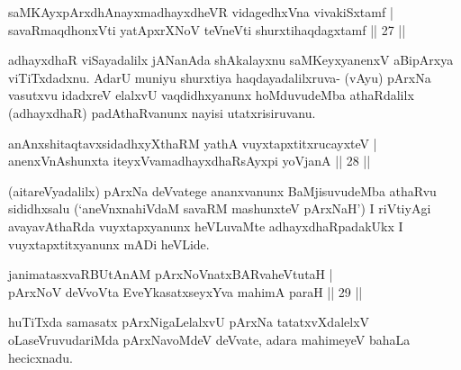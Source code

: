 \begin{shl}
\footnotemark[1]{}saMKAyxpArxdhAnayxmadhayxdheVR vidagedhxVna vivakiSxtamf |\\
savaRmaqdhonxVti yatApxrXNoV teVneVti shurxtihaqdagxtamf \hfill || 27 ||
\end{shl}

\begin{artha}
adhayxdhaR viSayadalilx jANanAda shAkalayxnu saMKeyxyanenxV aBipArxya viTiTxdadxnu. AdarU muniyu shurxtiya haqdayadalilxruva- (vAyu) pArxNa vasutxvu idadxreV elalxvU vaqdidhxyanunx hoMduvudeMba athaRdalilx (adhayxdhaR) padAthaRvanunx nayisi utatxrisiruvanu.
\end{artha}


\begin{shl}
anAnxshitaqtavxsidadhxyXthaRM yathA vuyxtapxtitxrucayxteV |\\
anenxVnAshunxta iteyxVvamadhayxdhaRsAyxpi yoVjanA \hfill || 28 ||
\end{shl}

\begin{artha}
(aitareVyadalilx) pArxNa deVvatege ananxvanunx BaMjisuvudeMba athaRvu sididhxsalu (`aneVnxnahiVdaM savaRM mashunxteV pArxNaH') I riVtiyAgi avayavAthaRda vuyxtapxyanunx heVLuvaMte adhayxdhaRpadakUkx I vuyxtapxtitxyanunx mADi heVLide.
\end{artha}


\begin{shl}
janimatasxvaRBUtAnAM pArxNoV\s natxBARvaheVtutaH |\\
pArxNoV deVvoV\s ta EveYkasatxseyxYva mahimA paraH \hfill || 29 ||
\end{shl}

\begin{artha}
huTiTxda samasatx pArxNigaLelalxvU pArxNa tatatxvXdalelxV oLaseVruvudariMda pArxNavoMdeV deVvate, adara mahimeyeV bahaLa hecicxnadu.
\end{artha}


